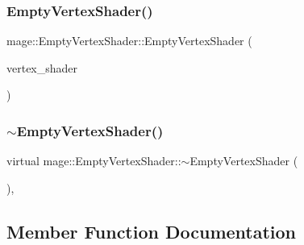 \hypertarget{classmage_1_1_empty_vertex_shader_a04d905fda6f77338521746fee50e6bf7}{}\label{classmage_1_1_empty_vertex_shader_a04d905fda6f77338521746fee50e6bf7} 
\subsubsection{\texorpdfstring{Empty\+Vertex\+Shader()}{EmptyVertexShader()}\hspace{0.1cm}{\footnotesize\ttfamily [3/3]}}
{\footnotesize\ttfamily mage\+::\+Empty\+Vertex\+Shader\+::\+Empty\+Vertex\+Shader (\begin{DoxyParamCaption}\item[{\hyperlink{classmage_1_1_empty_vertex_shader}{Empty\+Vertex\+Shader} \&\&}]{vertex\+\_\+shader }\end{DoxyParamCaption})\hspace{0.3cm}{\ttfamily [default]}}

\hypertarget{classmage_1_1_empty_vertex_shader_a321ef00a2087030b81713e989ab02306}{}\label{classmage_1_1_empty_vertex_shader_a321ef00a2087030b81713e989ab02306} 
\subsubsection{\texorpdfstring{$\sim$\+Empty\+Vertex\+Shader()}{~EmptyVertexShader()}}
{\footnotesize\ttfamily virtual mage\+::\+Empty\+Vertex\+Shader\+::$\sim$\+Empty\+Vertex\+Shader (\begin{DoxyParamCaption}{ }\end{DoxyParamCaption})\hspace{0.3cm}{\ttfamily [virtual]}, {\ttfamily [default]}}



\subsection{Member Function Documentation}
\hypertarget{classmage_1_1_empty_vertex_shader_aaecd66ff2aa90221accbde8e5bf1f239}{}\label{classmage_1_1_empty_vertex_shader_aaecd66ff2aa90221accbde8e5bf1f239} 
